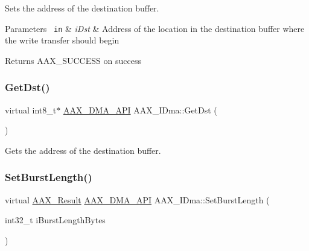 Sets the address of the destination buffer. 


\begin{DoxyParams}[1]{Parameters}
\mbox{\texttt{ in}}  & {\em i\+Dst} & Address of the location in the destination buffer where the write transfer should begin\\
\hline
\end{DoxyParams}
\begin{DoxyReturn}{Returns}
{\ttfamily A\+A\+X\+\_\+\+S\+U\+C\+C\+E\+SS} on success 
\end{DoxyReturn}
\mbox{\label{a01809_a19544dc2ec903f8e80d80db846ea8af0}} 
\subsubsection{\texorpdfstring{GetDst()}{GetDst()}}
{\footnotesize\ttfamily virtual int8\+\_\+t$\ast$ \mbox{\hyperlink{a00587_acae60d01e5e4bd3282369d0d9d378f3f}{A\+A\+X\+\_\+\+D\+M\+A\+\_\+\+A\+PI}} A\+A\+X\+\_\+\+I\+Dma\+::\+Get\+Dst (\begin{DoxyParamCaption}{ }\end{DoxyParamCaption})\hspace{0.3cm}{\ttfamily [pure virtual]}}



Gets the address of the destination buffer. 

\mbox{\label{a01809_ac85fdea20b072cbdc258aa398d02fa92}} 
\subsubsection{\texorpdfstring{SetBurstLength()}{SetBurstLength()}}
{\footnotesize\ttfamily virtual \mbox{\hyperlink{a00392_a4d8f69a697df7f70c3a8e9b8ee130d2f}{A\+A\+X\+\_\+\+Result}} \mbox{\hyperlink{a00587_acae60d01e5e4bd3282369d0d9d378f3f}{A\+A\+X\+\_\+\+D\+M\+A\+\_\+\+A\+PI}} A\+A\+X\+\_\+\+I\+Dma\+::\+Set\+Burst\+Length (\begin{DoxyParamCaption}\item[{int32\+\_\+t}]{i\+Burst\+Length\+Bytes }\end{DoxyParamCaption})\hspace{0.3cm}{\ttfamily [pure virtual]}}



